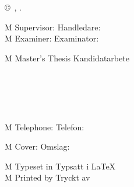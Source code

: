 { %
\newpage
\thispagestyle{empty}
\vspace*{4.5cm}
\thesisImprintTitle\\
\thesisImprintSubtitle\\
\thesisAuthor \setlength{\parskip}{1cm}

\copyright~\thesisAuthor, \thesisYear. \setlength{\parskip}{1cm}

\if\thesisType M
    Supervisor:
\else
    Handledare:
\fi
\thesisSupervisor\\
\if\thesisType M
    Examiner:
\else
    Examinator:
\fi
\thesisExaminer \setlength{\parskip}{1cm}

\if\thesisType M
    Master's Thesis
\else
    Kandidatarbete
\fi
\thesisYear\\
\thesisDepartment\\
\thesisDivision\\
\ifx\thesisGroup\undefined
\else
\thesisGroup\\
\fi
\thesisUniversity\\
\thesisImprintLocation\\
\if\thesisType M
    Telephone:
\else
    Telefon:
\fi
\thesisUniversityTel \setlength{\parskip}{0.5cm}

\vfill
\ifx\thesisCoverFigure\undefined
\else
    \if\thesisType M
        Cover:
    \else
        Omslag:
    \fi
    \thesisCoverFigureCaption
    \setlength{\parskip}{0.5cm}
\fi

\if\thesisType M
    Typeset in
\else
    Typsatt i
\fi
\LaTeX\\
\ifx\thesisPrintedBy\undefined
\else
    \if\thesisType M
        Printed by
    \else
        Tryckt av
    \fi
    \thesisPrintedBy\\
\fi
\thesisLocation\ \thesisYear
}
